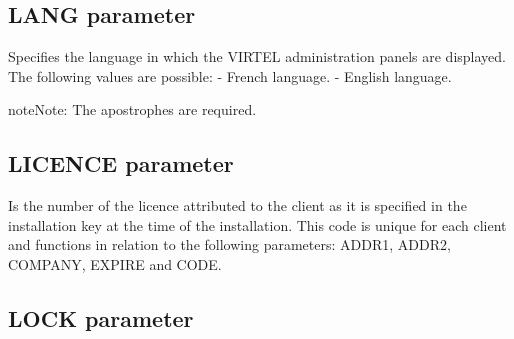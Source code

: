 \documentclass[letterpaper,10pt,english]{sphinxmanual}
\begin{document}
\subsection{LANG parameter}
\label{\detokenize{Installation_Guide:lang-parameter}}\label{\detokenize{Installation_Guide:index-83}}
\begin{sphinxVerbatim}[commandchars=\\\{\}]
                             
\end{sphinxVerbatim}

Specifies the language in which the VIRTEL administration panels are displayed. The following values are possible:
 - French language.
 - English language.

\begin{sphinxadmonition}{note}{Note:}
The apostrophes are required.
\end{sphinxadmonition}


\subsection{LICENCE parameter}
\label{\detokenize{Installation_Guide:index-84}}\label{\detokenize{Installation_Guide:licence-parameter}}
\begin{sphinxVerbatim}[commandchars=\\\{\}]
                          
\end{sphinxVerbatim}

Is the number of the licence attributed to the client as it is specified in the installation key at the time of the installation. This code is unique for each client and functions in relation to the following parameters: ADDR1, ADDR2, COMPANY, EXPIRE and CODE.


\subsection{LOCK parameter}
\label{\detokenize{Installation_Guide:index-85}}\label{\detokenize{Installation_Guide:lock-parameter}}
\begin{sphinxVerbatim}[commandchars=\\\{\}]
                               
\end{sphinxVerbatim}
\end{document}
